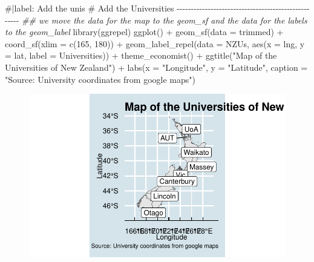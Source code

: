 \documentclass[
  letterpaper,
  DIV=11,
  numbers=noendperiod]{scrartcl}
\newenvironment{Shaded}{\begin{snugshade}}{\end{snugshade}}
\newcommand{\AttributeTok}[1]{\textcolor[rgb]{0.40,0.45,0.13}{#1}}
\newcommand{\CommentTok}[1]{\textcolor[rgb]{0.37,0.37,0.37}{#1}}
\newcommand{\DecValTok}[1]{\textcolor[rgb]{0.68,0.00,0.00}{#1}}
\newcommand{\DocumentationTok}[1]{\textcolor[rgb]{0.37,0.37,0.37}{\textit{#1}}}
\newcommand{\FunctionTok}[1]{\textcolor[rgb]{0.28,0.35,0.67}{#1}}
\newcommand{\NormalTok}[1]{\textcolor[rgb]{0.00,0.23,0.31}{#1}}
\newcommand{\SpecialCharTok}[1]{\textcolor[rgb]{0.37,0.37,0.37}{#1}}
\newcommand{\StringTok}[1]{\textcolor[rgb]{0.13,0.47,0.30}{#1}}
\begin{document}
\begin{Shaded}
\begin{Highlighting}[]
\CommentTok{\#|label: Add the unis}
\CommentTok{\# Add the Universities {-}{-}{-}{-}{-}{-}{-}{-}{-}{-}{-}{-}{-}{-}{-}{-}{-}{-}{-}{-}{-}{-}{-}{-}{-}{-}{-}{-}{-}{-}{-}{-}{-}{-}{-}{-}{-}{-}{-}{-}{-}{-}{-}{-}{-}{-}{-}{-}{-}{-}{-}{-}}
\DocumentationTok{\#\# we move the data for the map to the geom\_sf and the data for the labels to the geom\_label}
\FunctionTok{library}\NormalTok{(ggrepel)}
\FunctionTok{ggplot}\NormalTok{() }\SpecialCharTok{+}
  \FunctionTok{geom\_sf}\NormalTok{(}\AttributeTok{data =}\NormalTok{ trimmed) }\SpecialCharTok{+}
  \FunctionTok{coord\_sf}\NormalTok{(}\AttributeTok{xlim =} \FunctionTok{c}\NormalTok{(}\DecValTok{165}\NormalTok{, }\DecValTok{180}\NormalTok{)) }\SpecialCharTok{+}
  \FunctionTok{geom\_label\_repel}\NormalTok{(}\AttributeTok{data =}\NormalTok{ NZUs, }\FunctionTok{aes}\NormalTok{(}\AttributeTok{x =}\NormalTok{ lng, }\AttributeTok{y =}\NormalTok{ lat, }\AttributeTok{label =}\NormalTok{ Universities)) }\SpecialCharTok{+}
  \FunctionTok{theme\_economist}\NormalTok{() }\SpecialCharTok{+}
  \FunctionTok{ggtitle}\NormalTok{(}\StringTok{"Map of the Universities of New Zealand"}\NormalTok{) }\SpecialCharTok{+}
  \FunctionTok{labs}\NormalTok{(}\AttributeTok{x =} \StringTok{"Longitude"}\NormalTok{, }
       \AttributeTok{y =} \StringTok{"Latitude"}\NormalTok{, }
       \AttributeTok{caption =} \StringTok{"Source: University coordinates from google maps"}\NormalTok{) }
\end{Highlighting}
\end{Shaded}

\begin{figure}[H]

{\centering \includegraphics{Introduction-to-mapping_files/figure-pdf/unnamed-chunk-21-1.pdf}

}

\end{figure}
\end{document}
